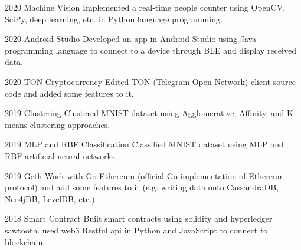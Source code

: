 \documentclass{tccv}
\begin{document}
\begin{yearlist}
\item{2020}
{Machine Vision} 
	{Implemented a real-time people counter using OpenCV, SciPy, deep learning, etc. in Python language programming.}

\item{2020}
	{Android Studio}
	{Developed an app in Android Studio using Java programming language to connect to a device through BLE and display received data.}



\item{2020}
	{TON Cryptocurrency}
	{Edited TON (Telegram Open Network) client source code and added some features to it.}
	
\item{2019}
	{Clustering}
	{Clustered MNIST dataset using Agglomerative, Affinity, and K-means clustering approaches. }

\item{2019}
	{MLP and RBF Classification}
	{Classified MNIST dataset using MLP and RBF artificial neural networks.}

\item{2019}
     {Geth}
     {Work with Go-Ethereum (official Go implementation of Ethereum protocol) and add some features to it (e.g. writing data onto CassandraDB, Neo4jDB, LevelDB, etc.).}


\item{2018}
     {Smart Contract}
     {Built smart contracts using solidity and hyperledger sawtooth. used web3 Restful api in Python and JavaScript to connect to blockchain.}


\end{yearlist}
\end{document}
